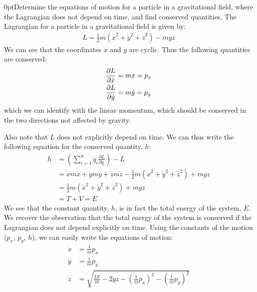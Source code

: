 \begin{example}{0pt}{Determine the equations of motion for a particle in a gravitational field, where the Lagrangian does not depend on time, and find conserved quantities.}{}
The Lagrangian for a particle in a gravitational field is given by:
\begin{align*}
L=\frac{1}{2}m(\dot{x}^2+\dot{y}^2+\dot{z}^2)-mgz
\end{align*}
We can see that the coordinates $x$ and $y$ are cyclic. Thus the following quantities are conserved:
\begin{align*}
\frac{\partial L}{\partial \dot{x}}&=m\dot{x}=p_x\\
\frac{\partial L}{\partial \dot{y}}&=m\dot{y}=p_y
\end{align*}
which we can identify with the linear momentum, which should be conserved in the two directions not affected by gravity.

Also note that $L$ does not explicitly depend on time. We can thus write the following equation for the conserved quantity, $h$:
\begin{align*}
h&=\left(\sum_{i=1}^n \dot{q}_i\frac{\partial L}{\partial \dot{q}_i}\right) -L \nonumber\\
&=\dot{x}m\dot{x}+\dot{y}m\dot{y}+\dot{z}m\dot{z}-\frac{1}{2}m(\dot{x}^2+\dot{y}^2+\dot{z}^2)+mgz\nonumber\\
&=\frac{1}{2}m(\dot{x}^2+\dot{y}^2+\dot{z}^2)+mgz\nonumber\\
&=T+V=E
\end{align*}
We see that the constant quantity, $h$, is in fact the total energy of the system, $E$. We recover the observation that the total energy of the system is conserved if the Lagrangian does not depend explicitly on time. Using the constants of the motion ($p_x$, $p_y$, $h$), we can easily write the equations of motion:
\begin{align*}
\dot{x}&=\frac{1}{m}p_x\\
\dot{y}&=\frac{1}{m}p_y\\
\dot{z}&=\sqrt{\frac{2E}{m}-2gz-\left(\frac{1}{m}p_x\right)^2-\left(\frac{1}{m}p_y\right)^2}
\end{align*}


\end{example}
